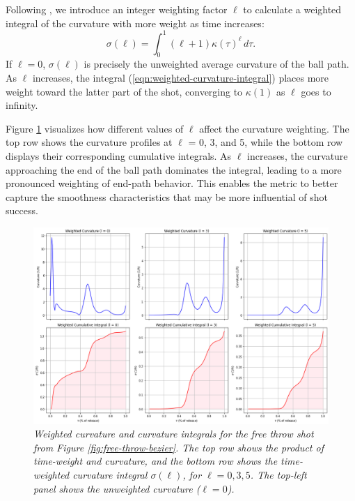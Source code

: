 \documentclass{article}
\begin{document}
          Following \citet{slegers_role_2024}, we introduce an integer weighting factor $\ell$ to calculate a weighted integral of the curvature with more weight as time increases:
          \begin{equation}
          \label{eqn:weighted-curvature-integral}
            \sigma(\ell) = \int_{0}^{1} (\ell + 1) \kappa(\tau)^\ell \, d\tau.
          \end{equation}
          If \(\ell = 0\), \(\sigma(\ell)\) is precisely the unweighted average curvature of the ball path. As $\ell$ increases, the integral (\ref{eqn:weighted-curvature-integral}) places more weight toward the latter part of the shot, converging to \(\kappa(1)\) as $\ell$ goes to infinity. 
    
          Figure \ref{fig:weights} visualizes how different values of $\ell$ affect the curvature weighting. The top row shows the curvature profiles at $\ell$ = 0, 3, and 5, while the bottom row displays their corresponding cumulative integrals. As $\ell$ increases, the curvature approaching the end of the ball path dominates the integral, leading to a more pronounced weighting of end-path behavior. This enables the metric to better capture the smoothness characteristics that may be more influential of shot success.

          \begin{figure}[H]
              \centering
              \includegraphics[width=0.8\linewidth]{articles/figures/weights.png}
              \caption{\it Weighted curvature and curvature integrals for the free throw shot from Figure \ref{fig:free-throw-bezier}. The top row shows the product of time-weight and curvature, and the bottom row shows the time-weighted curvature integral \(\sigma(\ell)\), for \(\ell = 0, 3, 5\). The top-left panel shows the unweighted curvature (\(\ell = 0\)).}
              \label{fig:weights}
          \end{figure}
\end{document}
